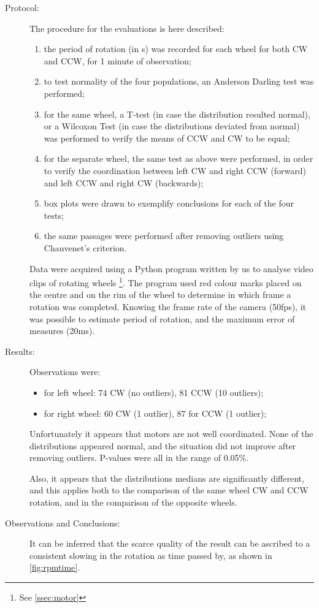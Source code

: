 \documentclass[a4paper,twoside]{book}
\begin{document}
\begin{description}
\item[Protocol:]
  The procedure for the evaluations is here described:
  \begin{enumerate}
    \item the period of rotation (in s) was recorded for each wheel for both CW and CCW, for 1 minute of observation;
    \item to test normality of the four populations, an Anderson Darling test was performed;
    \item for the same wheel, a T-test (in case the distribution resulted normal), or a Wilcoxon Test (in case the distributions deviated from normal) was performed to verify the means of CCW and CW to be equal;
    \item for the separate wheel, the same test as above were performed, in order to verify the coordination between left CW and right CCW (forward) and left CCW and right CW (backwards);
    \item box plots were drawn to exemplify conclusions for each of the four tests;
    \item the same passages were performed after removing outliers using Chauvenet's criterion.
  \end{enumerate}
  Data were acquired using a Python program written by us to analyse video clips of rotating wheels%
  \footnote{See \autoref{ssec:motor}}.
  The program used red colour marks placed on the centre and on the rim of the wheel to determine in which frame a rotation was completed. Knowing the frame rate of the camera (50fps), it was possible to estimate period of rotation, and the maximum error of measures (20ms).

\item[Results:]
  Observations were:
  \begin{itemize}
    \item for left wheel: 74 CW (no outliers), 81 CCW (10 outliers);
    \item for right wheel: 60 CW (1 outlier), 87 for CCW (1 outlier);
  \end{itemize}
  Unfortunately it appears that motors are not well coordinated. None of the distributions appeared normal, and the situation did not improve after removing outliers. P-values were all in the range of 0.05\%.

  Also, it appears that the distributions medians are significantly different, and this applies both to the comparison of the same wheel CW and CCW rotation, and in the comparison of the opposite wheels.

\item[Observations and Conclusions:]
  It can be inferred that the scarce quality of the result can be ascribed to a consistent slowing in the rotation as time passed by, as shown in
\autoref{fig:rpmtime}.
\end{description}
\afterlist*
\end{document}
